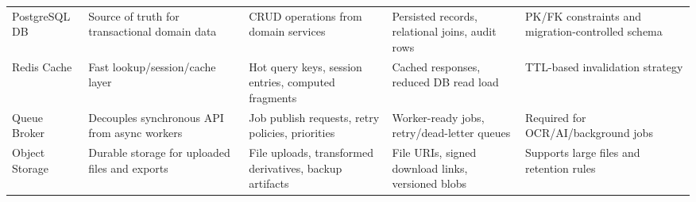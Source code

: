 \documentclass[12pt,a4paper]{article}
\begin{document}
\begin{longtable}{>{\raggedright\arraybackslash}p{2.1cm} >{\raggedright\arraybackslash}p{3.0cm} >{\raggedright\arraybackslash}p{2.8cm} >{\raggedright\arraybackslash}p{2.8cm} >{\raggedright\arraybackslash}p{4.0cm}}
    PostgreSQL DB & Source of truth for transactional domain data & CRUD operations from domain services & Persisted records, relational joins, audit rows & PK/FK constraints and migration-controlled schema \\
    Redis Cache & Fast lookup/session/cache layer & Hot query keys, session entries, computed fragments & Cached responses, reduced DB read load & TTL-based invalidation strategy \\
    Queue Broker & Decouples synchronous API from async workers & Job publish requests, retry policies, priorities & Worker-ready jobs, retry/dead-letter queues & Required for OCR/AI/background jobs \\
    Object Storage & Durable storage for uploaded files and exports & File uploads, transformed derivatives, backup artifacts & File URIs, signed download links, versioned blobs & Supports large files and retention rules \\
    \bottomrule
\end{longtable}
\normalsize
\end{document}
